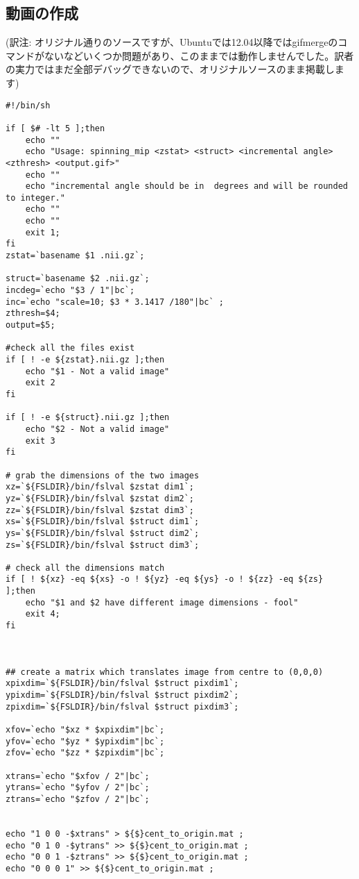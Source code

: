 \documentclass{jsarticle}
\begin{document}
\subsection{動画の作成}
\noindent(訳注: オリジナル通りのソースですが、Ubuntuでは12.04以降ではgifmergeのコマンドがないなどいくつか問題があり、このままでは動作しませんでした。訳者の実力ではまだ全部デバッグできないので、オリジナルソースのまま掲載します)

\begin{verbatim}
#!/bin/sh

if [ $# -lt 5 ];then 
    echo ""
    echo "Usage: spinning_mip <zstat> <struct> <incremental angle> <zthresh> <output.gif>"
    echo ""
    echo "incremental angle should be in  degrees and will be rounded to integer."
    echo ""
    echo ""
    exit 1;
fi
zstat=`basename $1 .nii.gz`;

struct=`basename $2 .nii.gz`;
incdeg=`echo "$3 / 1"|bc`;
inc=`echo "scale=10; $3 * 3.1417 /180"|bc` ;
zthresh=$4;
output=$5;

#check all the files exist
if [ ! -e ${zstat}.nii.gz ];then
    echo "$1 - Not a valid image"
    exit 2
fi 

if [ ! -e ${struct}.nii.gz ];then
    echo "$2 - Not a valid image"
    exit 3
fi 

# grab the dimensions of the two images
xz=`${FSLDIR}/bin/fslval $zstat dim1`;
yz=`${FSLDIR}/bin/fslval $zstat dim2`;
zz=`${FSLDIR}/bin/fslval $zstat dim3`;
xs=`${FSLDIR}/bin/fslval $struct dim1`;
ys=`${FSLDIR}/bin/fslval $struct dim2`;
zs=`${FSLDIR}/bin/fslval $struct dim3`;
 
# check all the dimensions match
if [ ! ${xz} -eq ${xs} -o ! ${yz} -eq ${ys} -o ! ${zz} -eq ${zs} ];then
    echo "$1 and $2 have different image dimensions - fool"
    exit 4; 
fi 



## create a matrix which translates image from centre to (0,0,0) 
xpixdim=`${FSLDIR}/bin/fslval $struct pixdim1`;
ypixdim=`${FSLDIR}/bin/fslval $struct pixdim2`;
zpixdim=`${FSLDIR}/bin/fslval $struct pixdim3`;

xfov=`echo "$xz * $xpixdim"|bc`;
yfov=`echo "$yz * $ypixdim"|bc`;
zfov=`echo "$zz * $zpixdim"|bc`;

xtrans=`echo "$xfov / 2"|bc`;
ytrans=`echo "$yfov / 2"|bc`;
ztrans=`echo "$zfov / 2"|bc`;


echo "1 0 0 -$xtrans" > ${$}cent_to_origin.mat ;
echo "0 1 0 -$ytrans" >> ${$}cent_to_origin.mat ;
echo "0 0 1 -$ztrans" >> ${$}cent_to_origin.mat ;
echo "0 0 0 1" >> ${$}cent_to_origin.mat ;
 

\end{verbatim}
\end{document}
